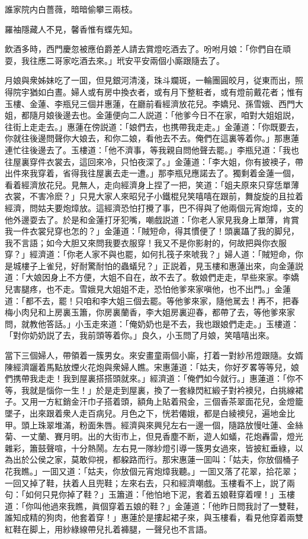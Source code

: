 \begin{myquote}
誰家院内白薔薇，暗暗偷攀三兩枝。

羅袖隱藏人不見，馨香惟有蝶先知。
\end{myquote}

飲酒多時，西門慶忽被應伯爵差人請去賞燈吃酒去了。吩咐月娘：「你們自在頑耍，我往應二哥家吃酒去來。」玳安平安兩個小廝跟隨去了。

月娘與衆姊妹吃了一囬，但見銀河清淺，珠斗斕斑，一輪團圓皎月，従東而出，照得院宇猶如白晝。婦人或有房中換衣者，或有月下整粧者，或有燈前戴花者；惟有玉樓、金蓮、李瓶兒三個并惠蓮，在廳前看經濟放花兒。李嬌兒、孫雪娥、西門大姐，都隨月娘後邊去也。金蓮便向二人説道：「他爹今日不在家，咱對大姐姐説，往街上走走去。」惠蓮在傍説道：「娘們去，也携帶我走走。」金蓮道：「你既要去，你就往後邊問聲你大娘去，和你二娘，看他去不去。俺們在這裏等着你。」那惠蓮連忙往後邊去了。玉樓道：「他不濟事，等我親自問他聲去罷。」李瓶兒道：「我也往屋裏穿件衣裳去，這回來冷，只怕夜深了。」金蓮道：「李大姐，你有披襖子，帶出件來我穿着，省得我往屋裏去走一遭。」那李瓶兒應諾去了。獨剩着金蓮一個，看着經濟放花兒。見無人，走向經濟身上捏了一把，笑道：「姐夫原來只穿恁單薄衣裳，不害冷麽？」只見大家人來昭兒子小鐵棍兒笑嘻嘻在跟前，舞旋旋的且拉着經濟，問姑夫要炮𤍤放。這經濟恐怕打攪了事，巴不得與了他兩個元宵炮𤍤，支的他外邊耍去了。於是和金蓮打牙犯嘴，嘲戲説道：「你老人家見我身上單薄，肯賞我一件衣裳兒穿也怎的？」金蓮道：「賊短命，得其慣便了！頭裏躡了我的脚兒，我不言語；如今大胆又來問我要衣服穿！我又不是你影射的，何故把與你衣服穿？」經濟道：「你老人家不與也罷，如何扎筏子來唬我？」婦人道：「賊短命，你是城樓子上雀兒，好耐驚耐怕的蟲蟻兒？」正説着，見玉樓和惠蓮出來，向金蓮説道：「大娘因身上不方便，大姐不自在，故不去了。敎娘們走走，早些來家。李嬌兒害腿疼，也不走。雪娥見大姐姐不走，恐怕他爹來家嗔他，也不出門。」金蓮道：「都不去，罷！只咱和李大姐三個去罷。等他爹來家，隨他駡去！再不，把春梅小肉兒和上房裏玉簫，你房裏蘭香，李大姐房裏迎春，都帶了去，等他爹來家問，就教他答話。」小玉走來道：「俺奶奶也是不去，我也跟娘們走走。」玉樓道：「對你奶奶説了去，我前頭等着你。」良久，小玉問了月娘，笑嘻嘻出來。

當下三個婦人，帶領着一簇男女。來安畫童兩個小廝，打着一對紗吊燈跟隨。女婿陳經濟躧着馬點放煙火花炮與衆婦人瞧。宋惠蓮道：「姑夫，你好歹畧等等兒，娘們携帶我走走！我到屋裏搭搭頭就來。」經濟道：「俺們如今就行。」惠蓮道：「你不等，我就是惱你一生！」於是走到屋裏，換了一套綠閃紅緞子對衿襖兒，白挑線裙子。又用一方紅銷金汗巾子搭着頭，額角上貼着飛金，三個香茶翠面花兒，金燈籠墜子，出來跟着衆人走百病兒。月色之下，恍若僊娥，都是白綾襖兒，遍地金比甲。頭上珠翠堆滿，粉面朱唇。經濟與來興兒左右一邊一個，隨路放慢吐蓮、金絲菊、一丈蘭、賽月明。出的大街市上，但見香塵不断，遊人如蟻，花炮轟雷，燈光雜彩，簫鼓聲喧，十分熱鬧。左右見一隊紗燈引導一簇男女過來，皆披紅垂綠，以為出於公侯之家，莫敢仰視，都躱路而行。那宋惠蓮一囬叫：「姑夫，你放個桶子花我瞧。」一囬又道：「姑夫，你放個元宵炮𤍤我聽。」一囬又落了花翠，拾花翠；一回又掉了鞋，扶着人且兜鞋；左來右去，只和經濟嘲戲。玉樓看不上，説了兩句：「如何只見你掉了鞋？」玉簫道：「他怕地下泥，套着五娘鞋穿着哩！」玉樓道：「你叫他過來我瞧，眞個穿着五娘的鞋？」金蓮道：「他昨日問我討了一雙鞋，誰知成精的狗肉，他套着穿！」惠蓮於是摟起裙子來，與玉樓看，看見他穿着兩雙紅鞋在脚上，用紗綠線帶兒扎着褲腿，一聲兒也不言語。

